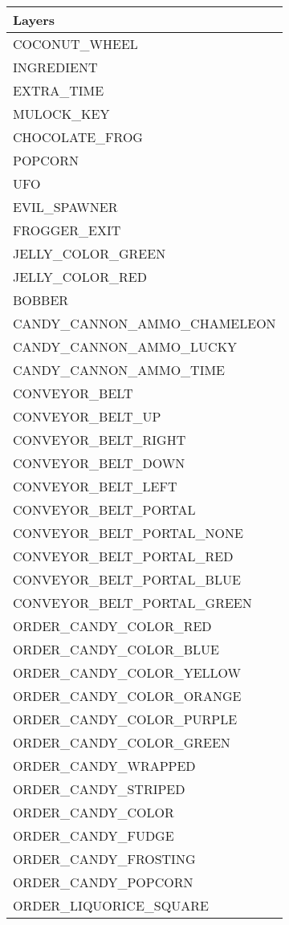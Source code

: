     \begin{tabular}{l}
    \toprule
    \textbf{Layers} \\%
    \midrule
    COCONUT\_WHEEL \\   
    INGREDIENT \\   
    EXTRA\_TIME \\ 
    MULOCK\_KEY \\   
    CHOCOLATE\_FROG \\ 
    POPCORN \\   
    UFO \\   
    EVIL\_SPAWNER \\   
    FROGGER\_EXIT \\ 
    JELLY\_COLOR\_GREEN \\   
    JELLY\_COLOR\_RED \\   
    BOBBER \\ 
    CANDY\_CANNON\_AMMO\_CHAMELEON \\ 
    CANDY\_CANNON\_AMMO\_LUCKY \\ 
    CANDY\_CANNON\_AMMO\_TIME \\ 

    CONVEYOR\_BELT \\ 
    CONVEYOR\_BELT\_UP \\   
    CONVEYOR\_BELT\_RIGHT \\   
    CONVEYOR\_BELT\_DOWN \\   
    CONVEYOR\_BELT\_LEFT \\   

    CONVEYOR\_BELT\_PORTAL \\ 
    CONVEYOR\_BELT\_PORTAL\_NONE \\ 
    CONVEYOR\_BELT\_PORTAL\_RED \\   
    CONVEYOR\_BELT\_PORTAL\_BLUE \\   
    CONVEYOR\_BELT\_PORTAL\_GREEN \\   

  
    
    ORDER\_CANDY\_COLOR\_RED \\ 
    ORDER\_CANDY\_COLOR\_BLUE \\ 
    ORDER\_CANDY\_COLOR\_YELLOW \\ 
    ORDER\_CANDY\_COLOR\_ORANGE \\ 
    ORDER\_CANDY\_COLOR\_PURPLE \\ 
    ORDER\_CANDY\_COLOR\_GREEN \\ 
    ORDER\_CANDY\_WRAPPED \\ 
    ORDER\_CANDY\_STRIPED \\ 
    ORDER\_CANDY\_COLOR \\ 
    ORDER\_CANDY\_FUDGE \\ 
    ORDER\_CANDY\_FROSTING \\ 
    ORDER\_CANDY\_POPCORN \\ 
    ORDER\_LIQUORICE\_SQUARE \\ 


\end{tabular}
